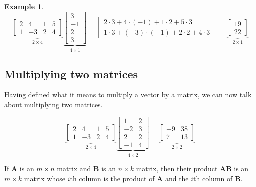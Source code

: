 \documentclass[
]{book}
\theoremstyle{definition}
\theoremstyle{definition}
\newtheorem{example}{Example}[chapter]
\theoremstyle{definition}
\theoremstyle{definition}
\theoremstyle{remark}
\begin{document}
\begin{examplebox}

\begin{example}
\[
\underbrace{\begin{bmatrix}
2 & 4 & 1 & 5\\ 
1 & -3 & 2 & 4\end{bmatrix}}_{2\times 4}\underbrace{\begin{bmatrix} 3 \\ -1 \\ 2 \\ 3
\end{bmatrix}}_{4\times 1}=\begin{bmatrix} 2\cdot 3+4\cdot (-1)+1\cdot 2+5\cdot 3\\ 1\cdot 3+(-3)\cdot (-1)+2\cdot 2+4\cdot 3
\end{bmatrix}
=\underbrace{\begin{bmatrix} 19\\22\end{bmatrix}}_{2\times 1}
\]
\end{example}

\end{examplebox}

\subsection*{Multiplying two matrices}\label{multiplying-two-matrices}

Having defined what it means to multiply a vector by a matrix, we can now talk about multiplying two matrices.

\[\underbrace{\begin{bmatrix}
2 & 4 & 1 & 5\\ 
1 & -3 & 2 & 4
\end{bmatrix}}_{2\times 4}
\underbrace{\begin{bmatrix}
1 & 2\\
-2 & 3\\
2 & 2\\
-1 & 4
\end{bmatrix}}_{4\times 2}=
\underbrace{
\begin{bmatrix}
-9 & 38 \\ 7 & 13\end{bmatrix}}_{2\times 2}\]

If \(\mathbf{A}\) is an \(m\times n\) matrix and \(\mathbf{B}\) is an \(n\times k\) matrix, then their product \(\mathbf{A}\mathbf{B}\) is an \(m\times k\) matrix whose \(i\)th column is the product of \(\mathbf{A}\) and the \(i\)th column of \(\mathbf{B}\).
\end{document}
